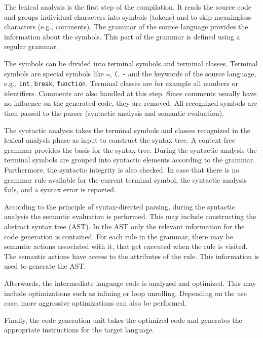 The lexical analysis is the first step of the compilation. It reads the source code and groups individual characters into symbols (tokens) and to skip meaningless characters (e.g., comments). The grammar of the source language provides the information about the symbols. This part of the grammar is defined using a regular grammar. 

The symbols can be divided into terminal symbols and terminal classes. Terminal symbols are special symbols like \texttt{=}, \texttt{(}, \texttt{-} and the keywords of the source language, e.g., \texttt{int}, \texttt{break},  \texttt{function}. Terminal classes are for example all numbers or identifiers. Comments are also handled at this step. Since comments usually have no influence on the generated code, they are removed. All recognized symbols are then passed to the parser (syntactic analysis and semantic evaluation). 



The syntactic analysis takes the terminal symbols and classes recognized in the lexical analysis phase as input to construct the syntax tree. A context-free grammar provides the basis for the syntax tree. During the syntactic analysis the terminal symbols are grouped into syntactic elements according to the grammar. Furthermore, the syntactic integrity is also checked. In case that there is no grammar rule available for the current terminal symbol, the syntactic analysis fails, and a syntax error is reported.


According to the principle of syntax-directed parsing, during the syntactic analysis the semantic evaluation is performed. This may include constructing the abstract syntax tree (AST). In the AST only the relevant information for the code generation is contained. For each rule in the grammar, there may be semantic actions associated with it, that get executed when the rule is visited. The semantic actions have access to the attributes of the rule. This information is used to generate the AST.  


Afterwards, the intermediate language code is analyzed and optimized. This may include optimizations such as inlining or loop unrolling. Depending on the use case, more aggressive optimizations can also be performed. 

Finally, the code generation unit takes the optimized code and generates the appropriate instructions for the target language. 